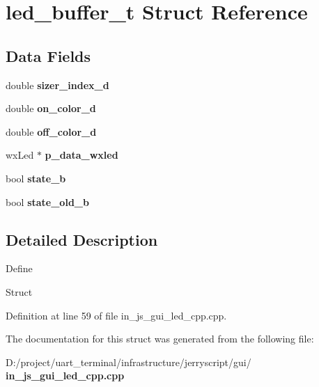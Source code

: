 \section{led\+\_\+buffer\+\_\+t Struct Reference}
\label{structled__buffer__t}
\subsection*{Data Fields}
\begin{DoxyCompactItemize}
\item 
\mbox{\label{structled__buffer__t_aae99f717aadbf88f890c71a293468af8}} 
double {\bfseries sizer\+\_\+index\+\_\+d}
\item 
\mbox{\label{structled__buffer__t_a5bc714ca3ab0688141ce83b6b0fa136a}} 
double {\bfseries on\+\_\+color\+\_\+d}
\item 
\mbox{\label{structled__buffer__t_a81421e171363e9c54dbc74eb116b3200}} 
double {\bfseries off\+\_\+color\+\_\+d}
\item 
\mbox{\label{structled__buffer__t_afa7db8f8c6d4ff3e956d7d7b16ba0c6d}} 
wx\+Led $\ast$ {\bfseries p\+\_\+data\+\_\+wxled}
\item 
\mbox{\label{structled__buffer__t_ad60c38399e569713ffb0f12e385ae907}} 
bool {\bfseries state\+\_\+b}
\item 
\mbox{\label{structled__buffer__t_a6695bd76c2e210600d6140691ffcd05f}} 
bool {\bfseries state\+\_\+old\+\_\+b}
\end{DoxyCompactItemize}


\subsection{Detailed Description}
Define

Struct 

Definition at line 59 of file in\+\_\+js\+\_\+gui\+\_\+led\+\_\+cpp.\+cpp.



The documentation for this struct was generated from the following file\+:\begin{DoxyCompactItemize}
\item 
D\+:/project/uart\+\_\+terminal/infrastructure/jerryscript/gui/\textbf{ in\+\_\+js\+\_\+gui\+\_\+led\+\_\+cpp.\+cpp}\end{DoxyCompactItemize}
